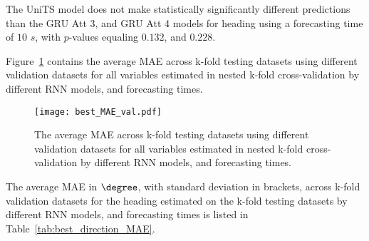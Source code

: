 The UniTS model does not make statistically significantly different predictions than the GRU Att 3, and GRU Att 4 models for heading using a forecasting time of $10$ $s$, with $p$-values equaling $0.132$, and $0.228$.

Figure~\ref{fig:best_MAE_val} contains the average MAE across k-fold testing datasets using different validation datasets for all variables estimated in nested k-fold cross-validation by different RNN models, and forecasting times.

\begin{figure}[!ht]
	\centering
	\texttt{[image: best\_MAE\_val.pdf]}
	\caption{The average MAE across k-fold testing datasets using different validation datasets for all variables estimated in nested k-fold cross-validation by different RNN models, and forecasting times.}
	\label{fig:best_MAE_val}
\end{figure}

The average MAE in $\degree$, with standard deviation in brackets, across k-fold validation datasets for the heading estimated on the k-fold testing datasets by different RNN models, and forecasting times is listed in Table~\ref{tab:best_direction_MAE}.

\begin{table}[!ht]
	\centering
	\caption{The average MAE in $\degree$, with standard deviation in brackets, across k-fold validation datasets for the heading estimated on the k-fold testing datasets by different RNN models, and forecasting times.}
	\label{tab:best_direction_MAE}
\end{table}

